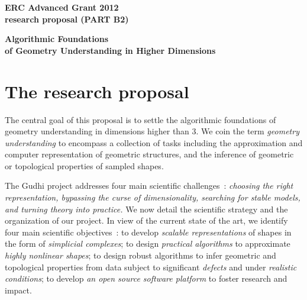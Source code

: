 \thispagestyle{empty}

\mbox{}\vspace{-3.5cm}

\begin{center}
{\Large
{\bf ERC Advanced Grant 2012 \\ research proposal (PART B2)}}
\vspace{1cm}

{\LARGE {\bf  Algorithmic Foundations \\ of 
Geometry Understanding in Higher Dimensions}

\vspace{3mm} 

}
\end{center}
\section{The research proposal}

The central goal of this proposal is to settle the algorithmic
foundations of geometry understanding in dimensions higher than 3.  We
coin the term {\em geometry understanding} to encompass a collection
of tasks including the approximation and computer representation 
of geometric structures, and the inference of geometric or topological
properties of sampled
shapes.  

The Gudhi project addresses four main scientific challenges~: {\em choosing the right representation, bypassing the curse of dimensionality, searching for stable models, and turning theory into practice.} We now detail the scientific strategy and the organization of our project. In view of the current state of the art, we %
identify four main scientific objectives~:  to develop {\em scalable representations} of shapes  in the form of {\em simplicial complexes};
to design {\em practical algorithms} to approximate {\em highly nonlinear shapes}; to design robust algorithms to infer geometric and topological properties from data subject to significant {\em defects} and under {\em realistic conditions}; to  develop  {\em an open source software platform} to foster research and impact.


